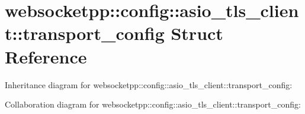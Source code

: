 \hypertarget{structwebsocketpp_1_1config_1_1asio__tls__client_1_1transport__config}{}\section{websocketpp\+:\+:config\+:\+:asio\+\_\+tls\+\_\+client\+:\+:transport\+\_\+config Struct Reference}
\label{structwebsocketpp_1_1config_1_1asio__tls__client_1_1transport__config}


Inheritance diagram for websocketpp\+:\+:config\+:\+:asio\+\_\+tls\+\_\+client\+:\+:transport\+\_\+config\+:


Collaboration diagram for websocketpp\+:\+:config\+:\+:asio\+\_\+tls\+\_\+client\+:\+:transport\+\_\+config\+:
